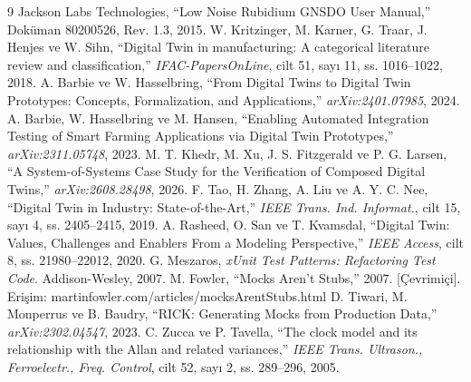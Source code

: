 \documentclass[9pt,twocolumn,a4paper]{extarticle}
\begin{document}
\begin{thebibliography}{9}
\footnotesize
{} Jackson Labs Technologies, ``Low Noise Rubidium GNSDO User Manual,'' Doküman 80200526, Rev. 1.3, 2015.
 W. Kritzinger, M. Karner, G. Traar, J. Henjes ve W. Sihn, ``Digital Twin in manufacturing: A categorical literature review and classification,'' \textit{IFAC-PapersOnLine}, cilt 51, sayı 11, ss. 1016--1022, 2018.
 A. Barbie ve W. Hasselbring, ``From Digital Twins to Digital Twin Prototypes: Concepts, Formalization, and Applications,'' \textit{arXiv:2401.07985}, 2024.
 A. Barbie, W. Hasselbring ve M. Hansen, ``Enabling Automated Integration Testing of Smart Farming Applications via Digital Twin Prototypes,'' \textit{arXiv:2311.05748}, 2023.
 M. T. Khedr, M. Xu, J. S. Fitzgerald ve P. G. Larsen, ``A System-of-Systems Case Study for the Verification of Composed Digital Twins,'' \textit{arXiv:2608.28498}, 2026.
 F. Tao, H. Zhang, A. Liu ve A. Y. C. Nee, ``Digital Twin in Industry: State-of-the-Art,'' \textit{IEEE Trans. Ind. Informat.}, cilt 15, sayı 4, ss. 2405--2415, 2019.
 A. Rasheed, O. San ve T. Kvamsdal, ``Digital Twin: Values, Challenges and Enablers From a Modeling Perspective,'' \textit{IEEE Access}, cilt 8, ss. 21980--22012, 2020.
 G. Meszaros, \textit{xUnit Test Patterns: Refactoring Test Code}. Addison-Wesley, 2007.
 M. Fowler, ``Mocks Aren't Stubs,'' 2007. [Çevrimiçi]. Erişim: martinfowler.com/articles/mocksArentStubs.html
 D. Tiwari, M. Monperrus ve B. Baudry, ``RICK: Generating Mocks from Production Data,'' \textit{arXiv:2302.04547}, 2023.
 C. Zucca ve P. Tavella, ``The clock model and its relationship with the Allan and related variances,'' \textit{IEEE Trans. Ultrason., Ferroelectr., Freq. Control}, cilt 52, sayı 2, ss. 289--296, 2005.
\end{thebibliography}
\end{document}
